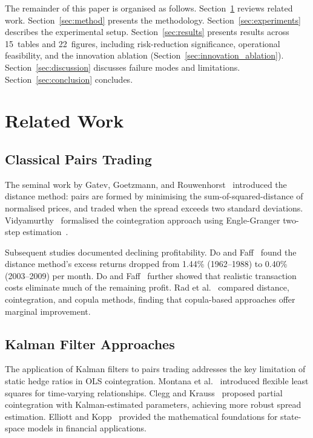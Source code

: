 \documentclass{ieeeaccess}
\begin{document}
The remainder of this paper is organised as follows.
Section~\ref{sec:related} reviews related work.
Section~\ref{sec:method} presents the methodology.
Section~\ref{sec:experiments} describes the experimental setup.
Section~\ref{sec:results} presents results across 15~tables and 22~figures, including risk-reduction significance, operational feasibility, and the innovation ablation (Section~\ref{sec:innovation_ablation}).
Section~\ref{sec:discussion} discusses failure modes and limitations.
Section~\ref{sec:conclusion} concludes.

\section{Related Work}
\label{sec:related}

\subsection{Classical Pairs Trading}

The seminal work by Gatev, Goetzmann, and Rouwenhorst~\cite{gatev2006pairs} introduced the distance method: pairs are formed by minimising the sum-of-squared-distance of normalised prices, and traded when the spread exceeds two standard deviations.
Vidyamurthy~\cite{vidyamurthy2004pairs} formalised the cointegration approach using Engle-Granger two-step estimation~\cite{engle1987cointegration}.

Subsequent studies documented declining profitability.
Do and Faff~\cite{do2010does} found the distance method's excess returns dropped from 1.44\% (1962--1988) to 0.40\% (2003--2009) per month.
Do and Faff~\cite{do2012pairs} further showed that realistic transaction costs eliminate much of the remaining profit.
Rad et al.~\cite{rad2016profitability} compared distance, cointegration, and copula methods, finding that copula-based approaches offer marginal improvement.

\subsection{Kalman Filter Approaches}

The application of Kalman filters to pairs trading addresses the key limitation of static hedge ratios in OLS cointegration.
Montana et al.~\cite{montana2009flexible} introduced flexible least squares for time-varying relationships.
Clegg and Krauss~\cite{clegg2018pairs} proposed partial cointegration with Kalman-estimated parameters, achieving more robust spread estimation.
Elliott and Kopp~\cite{elliott2005kalman} provided the mathematical foundations for state-space models in financial applications.
\end{document}
